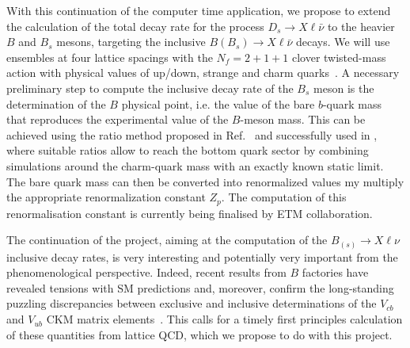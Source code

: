 With this continuation of the computer time application, we propose to extend
the calculation of the total decay rate for the process $D_s \to X\ell\bar\nu$ to the
heavier $B$ and $B_s$ mesons, targeting the inclusive $B (B_s) \to
X\ell\bar\nu$ decays.
We will use ensembles at four lattice spacings with the $N_f=2+1+1$ clover twisted-mass action with physical 
values of up/down, strange and charm
quarks~\cite{ExtendedTwistedMass:2021qui,ExtendedTwistedMass:2021gbo,ExtendedTwistedMass:2022jpw}. 
A necessary preliminary step to compute the inclusive decay rate of the $B_s$
meson is the determination of the
$B$ physical point, i.e. the value of the bare $b$-quark mass that reproduces the
experimental value of the $B$-meson mass.
This can be
achieved using the ratio method proposed in Ref.~\cite{ETM:2009sed}
and successfully used in \cite{ETM:2016nbo}, where suitable ratios allow
to reach the bottom quark sector by combining simulations around the
charm-quark mass with an exactly known static limit.
The bare quark mass can then be converted into renormalized values my multiply
the appropriate renormalization constant $Z_p$. The computation of
this renormalisation constant is currently being finalised by ETM collaboration.


The continuation of the project, aiming at the computation of the $B_{(s)}\to X \ell\nu$
inclusive decay rates, is very interesting and potentially very important from
the phenomenological perspective. Indeed, recent results from $B$
factories have revealed tensions with SM predictions and, moreover,
confirm the long-standing puzzling discrepancies between exclusive and
inclusive determinations of the $V_{cb}$ and $V_{ub}$ CKM matrix
elements~\cite{ParticleDataGroup:2022pth,HFLAV:2022esi,Gambino:2019sif}. This
calls for a timely first principles calculation of these quantities
from lattice QCD, which we propose to do with this project.
